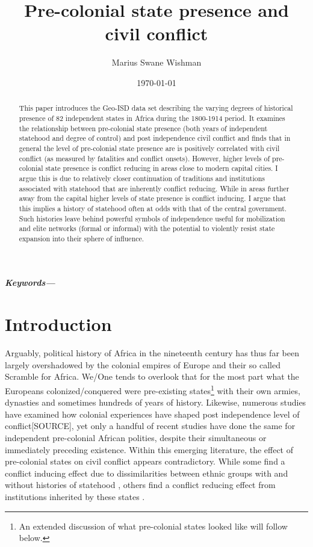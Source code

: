 \documentclass[12pt]{article}
\title{Pre-colonial state presence and civil conflict}
\author[1]{Marius Swane Wishman}
\affil[1]{Department of Sociology and Political Science, NTNU}
\date{\today}
\providecommand{\keywords}[1]
{
	\small	
	\textbf{\textit{Keywords---}} #1
}
\begin{document}
\maketitle

\begin{abstract}

This paper introduces the Geo-ISD data set describing the varying degrees of
historical presence of 82 independent states in Africa during the 1800-1914
period. It examines the relationship between pre-colonial state presence (both
years of independent statehood and degree of control) and post independence
civil conflict and finds that in general the level of pre-colonial state
presence are is positively correlated with civil conflict (as measured by
fatalities and conflict onsets). However, higher levels of pre-colonial state
presence is conflict reducing in areas close to modern capital cities. I argue
this is due to relatively closer continuation of traditions and institutions
associated with statehood that are inherently conflict reducing. While in areas
further away from the capital higher levels of state presence is conflict
inducing. I argue that this implies a history of statehood often at odds with
that of the central government. Such histories leave behind powerful symbols of
independence useful for mobilization and elite networks (formal or informal)
with the potential to violently resist state expansion into their sphere of
influence. 

\end{abstract}

\keywords{}


\onehalfspacing


\newpage

\section{Introduction}

Arguably, political history of Africa in the nineteenth century has thus far
been largely overshadowed by the colonial empires of Europe and their so called
Scramble for Africa. We/One tends to overlook that for the most part what the
Europeans colonized/conquered were pre-existing states\footnote{An extended
discussion of what pre-colonial states looked like will follow below.} with
their own armies, dynasties and sometimes hundreds of years of history.
Likewise, numerous studies have examined how colonial experiences have shaped
post independence level of conflict[SOURCE], yet only a handful of recent
studies have done the same for independent pre-colonial African polities,
despite their simultaneous or immediately preceding existence. Within this
emerging literature, the effect of pre-colonial states on civil conflict appears
contradictory. While some find a conflict inducing effect due to dissimilarities
between ethnic groups with and without histories of statehood
\citep{Englebert2002, Paine2019}, others find a conflict reducing effect from
institutions inherited by these states \citep{Depetris-Chauvin2016, Wig2016}.
\end{document}
